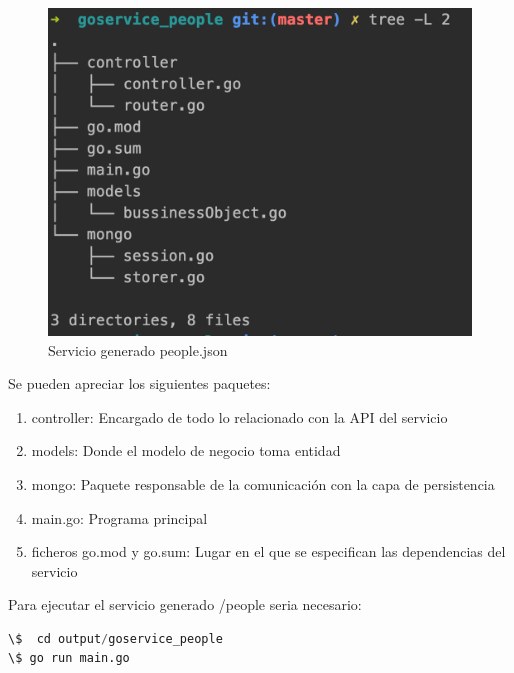 \documentclass[a4paper,11pt]{book}
\begin{document}
\begin{figure}[H]  
\centering 
\includegraphics[scale=0.35]{imagenes/t12.png}
\caption{ Servicio generado people.json}  
\end{figure}

Se pueden apreciar los siguientes paquetes:

\begin{enumerate}
\item controller: Encargado de todo lo relacionado con la API del servicio
\item models: Donde el modelo de negocio toma entidad
\item mongo: Paquete responsable de la comunicación con la capa de persistencia
\item main.go: Programa principal
\item ficheros go.mod y go.sum: Lugar en el que se especifican las dependencias del servicio
\end{enumerate}

Para ejecutar el servicio generado /people seria necesario: 


\begin{lstlisting}[language=python,caption={ Ejemplo Ejecución /people }]
\$  cd output/goservice_people
\$ go run main.go
\end{lstlisting} 
\end{document}
